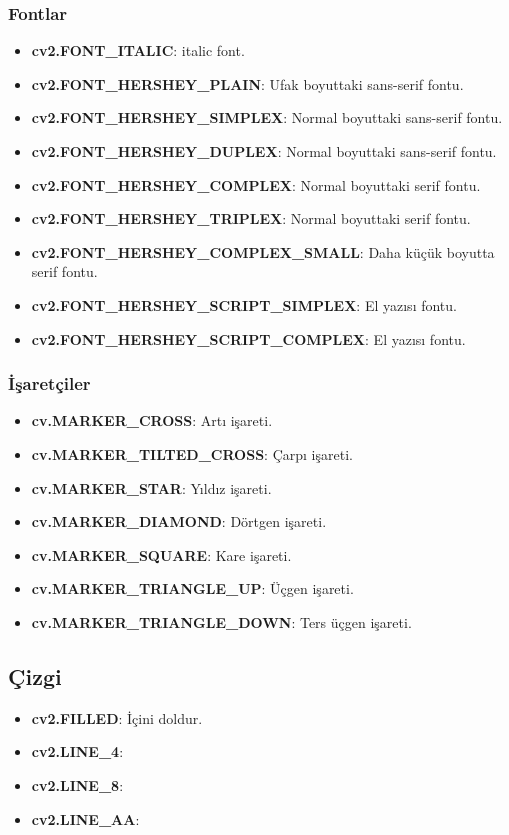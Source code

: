 \subsubsection{Fontlar}
\begin{itemize}
	\item \textbf{cv2.FONT\_ITALIC}: italic font.
	\item \textbf{cv2.FONT\_HERSHEY\_PLAIN}: Ufak boyuttaki sans-serif fontu.
	\item \textbf{cv2.FONT\_HERSHEY\_SIMPLEX}: Normal boyuttaki sans-serif fontu.
	\item \textbf{cv2.FONT\_HERSHEY\_DUPLEX}: Normal boyuttaki sans-serif fontu.
	\item \textbf{cv2.FONT\_HERSHEY\_COMPLEX}: Normal boyuttaki serif fontu.
	\item \textbf{cv2.FONT\_HERSHEY\_TRIPLEX}: Normal boyuttaki serif fontu.
	\item \textbf{cv2.FONT\_HERSHEY\_COMPLEX\_SMALL}: Daha küçük boyutta serif fontu.
	\item \textbf{cv2.FONT\_HERSHEY\_SCRIPT\_SIMPLEX}: El yazısı fontu.
	\item \textbf{cv2.FONT\_HERSHEY\_SCRIPT\_COMPLEX}: El yazısı fontu. 
\end{itemize}

\subsubsection{İşaretçiler}
\begin{itemize}
	\item \textbf{cv.MARKER\_CROSS}: Artı işareti.
	\item \textbf{cv.MARKER\_TILTED\_CROSS}: Çarpı işareti.
	\item \textbf{cv.MARKER\_STAR}: Yıldız işareti.
	\item \textbf{cv.MARKER\_DIAMOND}: Dörtgen işareti.
	\item \textbf{cv.MARKER\_SQUARE}: Kare işareti.
	\item \textbf{cv.MARKER\_TRIANGLE\_UP}: Üçgen işareti.
	\item \textbf{cv.MARKER\_TRIANGLE\_DOWN}: Ters üçgen işareti.
\end{itemize}

\subsection{Çizgi}
\begin{itemize}
	\item \textbf{cv2.FILLED}: İçini doldur.
	\item \textbf{cv2.LINE\_4}: 
	\item \textbf{cv2.LINE\_8}: 
	\item \textbf{cv2.LINE\_AA}: 
\end{itemize}

